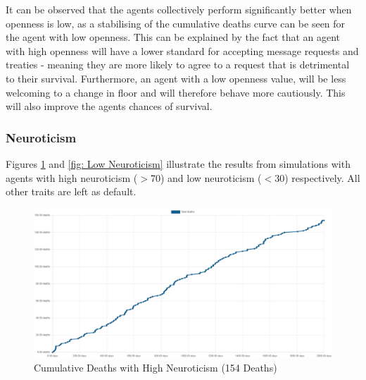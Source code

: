 It can be observed that the agents collectively perform significantly better when openness is low, as a stabilising of the cumulative deaths curve can be seen for the agent with low openness. This can be explained by the fact that an agent with high openness will have a lower standard for accepting message requests and treaties - meaning they are more likely to agree to a request that is detrimental to their survival. Furthermore, an agent with a low openness value, will be less welcoming to a change in floor and will therefore behave more cautiously. This will also improve the agents chances of survival. 


\subsubsection{Neuroticism}
\label{subsubsec: Neuroticism}

Figures \ref{fig: High Neuroticism} and \ref{fig: Low Neuroticism} illustrate the results from simulations with agents with high neuroticism ($>$70) and low neuroticism ($<$30) respectively. All other traits are left as default.

\begin{figure}[H]
    \begin{center}
        \includegraphics[scale=0.25]{Images/Cumulative Deaths, With Treaties, T7Only, 2000days, 20food, High Neur, 154deaths.png}
    \end{center}
    \caption{Cumulative Deaths with High Neuroticism (154 Deaths)}
    \label{fig: High Neuroticism}
\end{figure}

